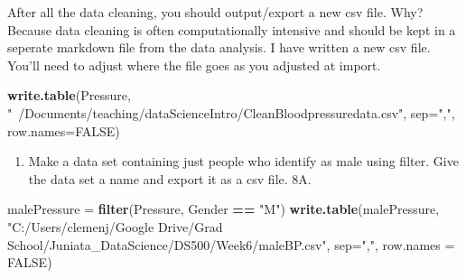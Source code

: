 \documentclass[
]{article}
\newenvironment{Shaded}{\begin{snugshade}}{\end{snugshade}}
\newcommand{\DataTypeTok}[1]{\textcolor[rgb]{0.13,0.29,0.53}{#1}}
\newcommand{\KeywordTok}[1]{\textcolor[rgb]{0.13,0.29,0.53}{\textbf{#1}}}
\newcommand{\NormalTok}[1]{#1}
\newcommand{\OperatorTok}[1]{\textcolor[rgb]{0.81,0.36,0.00}{\textbf{#1}}}
\newcommand{\OtherTok}[1]{\textcolor[rgb]{0.56,0.35,0.01}{#1}}
\newcommand{\StringTok}[1]{\textcolor[rgb]{0.31,0.60,0.02}{#1}}
\providecommand{\tightlist}{%
  \setlength{\itemsep}{0pt}\setlength{\parskip}{0pt}}
\begin{document}
After all the data cleaning, you should output/export a new csv file.
Why? Because data cleaning is often computationally intensive and should
be kept in a seperate markdown file from the data analysis. I have
written a new csv file. You'll need to adjust where the file goes as you
adjusted at import.

\begin{Shaded}
\begin{Highlighting}[]
\KeywordTok{write.table}\NormalTok{(Pressure, }\StringTok{"~/Documents/teaching/dataScienceIntro/CleanBloodpressuredata.csv"}\NormalTok{, }\DataTypeTok{sep=}\StringTok{","}\NormalTok{, }\DataTypeTok{row.names=}\OtherTok{FALSE}\NormalTok{)}
\end{Highlighting}
\end{Shaded}

\begin{enumerate}
\def\labelenumi{\arabic{enumi}.}
\setcounter{enumi}{7}
\tightlist
\item
  Make a data set containing just people who identify as male using
  filter. Give the data set a name and export it as a csv file. 8A.
\end{enumerate}

\begin{Shaded}
\begin{Highlighting}[]
\NormalTok{malePressure =}\StringTok{ }\KeywordTok{filter}\NormalTok{(Pressure, Gender }\OperatorTok{==}\StringTok{ "M"}\NormalTok{)}
\KeywordTok{write.table}\NormalTok{(malePressure, }\StringTok{"C:/Users/clemenj/Google Drive/Grad School/Juniata_DataScience/DS500/Week6/maleBP.csv"}\NormalTok{, }\DataTypeTok{sep=}\StringTok{","}\NormalTok{, }\DataTypeTok{row.names =} \OtherTok{FALSE}\NormalTok{)}
\end{Highlighting}
\end{Shaded}
\end{document}
